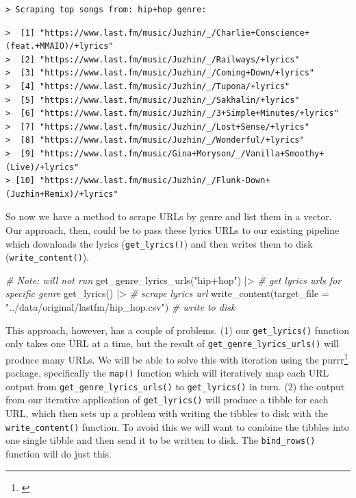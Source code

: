 \documentclass[
  letterpaper,
]{latex/krantz}
\newenvironment{Shaded}{\begin{snugshade}}{\end{snugshade}}
\newcommand{\AttributeTok}[1]{\textcolor[rgb]{0.00,0.00,0.00}{#1}}
\newcommand{\CommentTok}[1]{\textcolor[rgb]{0.00,0.00,0.00}{\textit{#1}}}
\newcommand{\FunctionTok}[1]{\textcolor[rgb]{0.00,0.00,0.00}{#1}}
\newcommand{\NormalTok}[1]{\textcolor[rgb]{0.00,0.00,0.00}{#1}}
\newcommand{\SpecialCharTok}[1]{\textcolor[rgb]{0.00,0.00,0.00}{#1}}
\newcommand{\StringTok}[1]{\textcolor[rgb]{0.00,0.00,0.00}{#1}}
\DeclareRobustCommand{\href}[2]{#2\footnote{\url{#1}}}
\begin{document}
\begin{verbatim}
> Scraping top songs from: hip+hop genre:
\end{verbatim}

\begin{verbatim}
>  [1] "https://www.last.fm/music/Juzhin/_/Charlie+Conscience+(feat.+MMAIO)/+lyrics"
>  [2] "https://www.last.fm/music/Juzhin/_/Railways/+lyrics"                        
>  [3] "https://www.last.fm/music/Juzhin/_/Coming+Down/+lyrics"                     
>  [4] "https://www.last.fm/music/Juzhin/_/Tupona/+lyrics"                          
>  [5] "https://www.last.fm/music/Juzhin/_/Sakhalin/+lyrics"                        
>  [6] "https://www.last.fm/music/Juzhin/_/3+Simple+Minutes/+lyrics"                
>  [7] "https://www.last.fm/music/Juzhin/_/Lost+Sense/+lyrics"                      
>  [8] "https://www.last.fm/music/Juzhin/_/Wonderful/+lyrics"                       
>  [9] "https://www.last.fm/music/Gina+Moryson/_/Vanilla+Smoothy+(Live)/+lyrics"    
> [10] "https://www.last.fm/music/Juzhin/_/Flunk-Down+(Juzhin+Remix)/+lyrics"
\end{verbatim}

So now we have a method to scrape URLs by genre and list them in a
vector. Our approach, then, could be to pass these lyrics URLs to our
existing pipeline which downloads the lyrics (\texttt{get\_lyrics()})
and then writes them to disk (\texttt{write\_content()}).

\begin{Shaded}
\begin{Highlighting}[]
\CommentTok{\# Note: will not run}
\FunctionTok{get\_genre\_lyrics\_urls}\NormalTok{(}\StringTok{"hip+hop"}\NormalTok{) }\SpecialCharTok{|\textgreater{}} \CommentTok{\# get lyrics urls for specific genre}
  \FunctionTok{get\_lyrics}\NormalTok{() }\SpecialCharTok{|\textgreater{}} \CommentTok{\# scrape lyrics url}
  \FunctionTok{write\_content}\NormalTok{(}\AttributeTok{target\_file =} \StringTok{"../data/original/lastfm/hip\_hop.csv"}\NormalTok{) }\CommentTok{\# write to disk}
\end{Highlighting}
\end{Shaded}

This approach, however, has a couple of problems. (1) our
\texttt{get\_lyrics()} function only takes one URL at a time, but the
result of \texttt{get\_genre\_lyrics\_urls()} will produce many URLs. We
will be able to solve this with iteration using the \href{}{purrr}
package, specifically the \texttt{map()} function which will iteratively
map each URL output from \texttt{get\_genre\_lyrics\_urls()} to
\texttt{get\_lyrics()} in turn. (2) the output from our iterative
application of \texttt{get\_lyrics()} will produce a tibble for each
URL, which then sets up a problem with writing the tibbles to disk with
the \texttt{write\_content()} function. To avoid this we will want to
combine the tibbles into one single tibble and then send it to be
written to disk. The \texttt{bind\_rows()} function will do just this.
\end{document}

